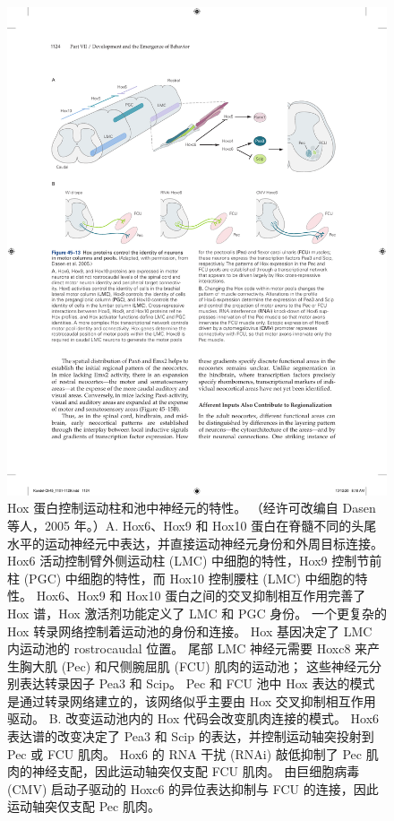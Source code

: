 \begin{figure}[htbp]
	\centering
	\includegraphics[width=0.95\linewidth]{chap45/fig_45_13}
	\caption{Hox 蛋白控制运动柱和池中神经元的特性。 （经许可改编自 Dasen 等人，2005 年。）A. Hox6、Hox9 和 Hox10 蛋白在脊髓不同的头尾水平的运动神经元中表达，并直接运动神经元身份和外周目标连接。 Hox6 活动控制臂外侧运动柱 (LMC) 中细胞的特性，Hox9 控制节前柱 (PGC) 中细胞的特性，而 Hox10 控制腰柱 (LMC) 中细胞的特性。 Hox6、Hox9 和 Hox10 蛋白之间的交叉抑制相互作用完善了 Hox 谱，Hox 激活剂功能定义了 LMC 和 PGC 身份。 一个更复杂的 Hox 转录网络控制着运动池的身份和连接。 Hox 基因决定了 LMC 内运动池的 rostrocaudal 位置。 尾部 LMC 神经元需要 Hoxc8 来产生胸大肌 (Pec) 和尺侧腕屈肌 (FCU) 肌肉的运动池； 这些神经元分别表达转录因子 Pea3 和 Scip。 Pec 和 FCU 池中 Hox 表达的模式是通过转录网络建立的，该网络似乎主要由 Hox 交叉抑制相互作用驱动。 B. 改变运动池内的 Hox 代码会改变肌肉连接的模式。 Hox6 表达谱的改变决定了 Pea3 和 Scip 的表达，并控制运动轴突投射到 Pec 或 FCU 肌肉。 Hox6 的 RNA 干扰 (RNAi) 敲低抑制了 Pec 肌肉的神经支配，因此运动轴突仅支配 FCU 肌肉。 由巨细胞病毒 (CMV) 启动子驱动的 Hoxc6 的异位表达抑制与 FCU 的连接，因此运动轴突仅支配 Pec 肌肉。}
	\label{fig:45_13}
\end{figure}


